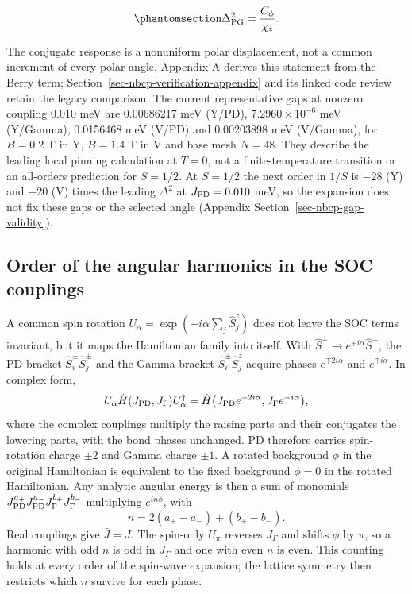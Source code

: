 \begin{equation}\phantomsection\label{eq-nbcp-gap-summary}{
\Delta_{\rm PG}^2=\frac{C_\phi}{\chi_z}.
}\end{equation}

The conjugate response is a nonuniform polar displacement, not a common
increment of every polar angle. Appendix A derives this statement from
the Berry term; Section~\ref{sec-nbcp-verification-appendix} and its
linked code review retain the legacy comparison. The current
representative gaps at nonzero coupling 0.010 meV are 0.00686217 meV
(Y/PD), \(7.2960\times10^{-6}\) meV (Y/Gamma), 0.0156468 meV (V/PD) and
0.00203898 meV (V/Gamma), for \(B=0.2\) T in Y, \(B=1.4\) T in V and
base mesh \(N=48\). They describe the leading local pinning
calculation at \(T=0\), not a finite-temperature transition or an
all-orders prediction for \(S=1/2\). At \(S=1/2\) the next order in
\(1/S\) is \(-28\) (Y) and \(-20\) (V) times the leading \(\Delta^2\) at
\(J_{\rm PD}=0.010\) meV, so the expansion does not fix these gaps or
the selected angle (Appendix Section~\ref{sec-nbcp-gap-validity}).

\subsection{Order of the angular harmonics in the SOC
couplings}\label{sec-nbcp-yv-selection-rule}

A common spin rotation \(U_\alpha=\exp(-i\alpha\sum_j\hat S_j^z)\) does not
leave the SOC terms invariant, but it maps the Hamiltonian family into
itself. With \(\hat S^\pm\to e^{\mp i\alpha}\hat S^\pm\), the PD bracket
\(\hat S^\pm_i\hat S^\pm_j\) and the Gamma bracket
\(\hat S^\pm_i\hat S^z_j\) acquire phases \(e^{\mp2i\alpha}\) and
\(e^{\mp i\alpha}\). In complex form,
\begin{equation}\label{eq-nbcp-soc-charge}
U_\alpha\hat H(J_{\rm PD},J_\Gamma)U_\alpha^\dagger
=\hat H\bigl(J_{\rm PD}e^{-2i\alpha},J_\Gamma e^{-i\alpha}\bigr),
\end{equation}
where the complex couplings multiply the raising parts and their
conjugates the lowering parts, with the bond phases unchanged. PD
therefore carries spin-rotation charge \(\pm2\) and Gamma charge
\(\pm1\). A rotated background \(\phi\) in the original Hamiltonian is
equivalent to the fixed background \(\phi=0\) in the rotated Hamiltonian.
Any analytic angular energy is then a sum of monomials
\(J_{\rm PD}^{a_+}\bar J_{\rm PD}^{a_-}J_\Gamma^{b_+}\bar J_\Gamma^{b_-}\)
multiplying \(e^{in\phi}\), with
\begin{equation}\label{eq-nbcp-soc-selection}
n=2(a_+-a_-)+(b_+-b_-).
\end{equation}
Real couplings give \(\bar J=J\). The spin-only \(U_\pi\) reverses
\(J_\Gamma\) and shifts \(\phi\) by \(\pi\), so a harmonic with odd
\(n\) is odd in \(J_\Gamma\) and one with even \(n\) is even. This
counting holds at every order of the spin-wave expansion; the lattice
symmetry then restricts which \(n\) survive for each phase.


